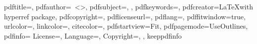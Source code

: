 \hypersetup
{
  pdftitle={\myBookTitle},
  pdfauthor={\myAuthorFullName~\textless\href{mailto:\myAuthorEmail}{\myAuthorEmail}\textgreater},
  pdfsubject={\myDegreefull, \myWorkTypeFull},
  pdfkeywords={\keywordsforpdf},
  pdfcreator={\LaTeX with hyperref package},
  pdfcopyright={\myCopyrightStatement},
  pdflicenseurl={\myLicenseURL},
  pdflang={\mypdflang},
  pdffitwindow={true},
  urlcolor=\myurlcolor,
  linkcolor=\mylinkcolor,
  citecolor=\mycitecolor,
  pdfstartview=Fit,
  pdfpagemode=UseOutlines,
  pdfinfo={
    License={\myLicenseURL},
    Language={\mypdflang},
    Copyright={\myCopyrightStatement},
  },
  keeppdfinfo %
}


\usepackage{tocloft}

{
\newcommand{\videoLink}[2]{%
  \refstepcounter{videos}%
  \phantomsection%
  \addcontentsline{vdo}{videos}{\protect\numberline{\thechapter.\thevideos\hspace{4em}}\hspace{4em}#1 (\href{#2}{link to video})}\href{#2}{#1}}
}
{
\newcommand{\videoLink}[2]{%
  \refstepcounter{videos}%
  \phantomsection%
  \addcontentsline{vdo}{videos}{\protect\numberline{\thechapter.\thevideos\hspace{4em}}\hspace{4em}#1 (\href{#2}{enlace al vídeo})}\href{#2}{#1}}
}




